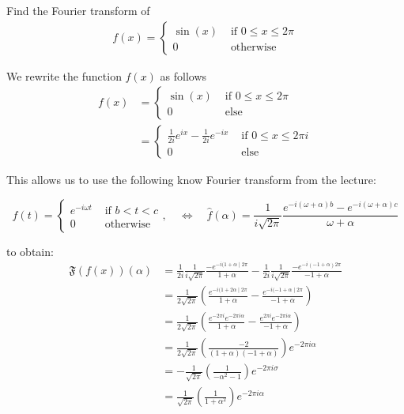 \documentclass[11pt]{article}
\begin{document}
\begin{exercise}
    Find the Fourier transform of 
    \begin{align*}
        f(x) = \left\{\begin{array}{ll}
                \sin(x) & \text{ if } 0 \leq x \leq 2 \pi 
                \\
                0 & \text{ otherwise }
               \end{array}
               \right.
    \end{align*}
\end{exercise}
\begin{solution} 
We rewrite the function $f(x)$ as follows    
$$\begin{aligned} f(x) & =\left\{\begin{array}{cl}\sin (x) & \text { if } 0 \leq x \leq 2 \pi \\ 0 & \text { else }\end{array}\right. \\ & =\left\{\begin{array}{cl}\frac{1}{2 i} e^{i x}-\frac{1}{2 i} e^{-i x} & \text { if } 0 \leq x \leq 2 \pi i \\ 0 & \text { else }\end{array}\right.\end{aligned}$$

This allows us to use the following know Fourier transform from the lecture:

$$
f(t)=\left\{\begin{array}{ll}
e^{-i \omega t} & \text { if } b<t<c \\
0 & \text { otherwise }
\end{array}, \quad \Longleftrightarrow \quad \hat{f}(\alpha)=\frac{1}{i \sqrt{2 \pi}} \frac{e^{-i(\omega+\alpha) b}-e^{-i(\omega+\alpha) c}}{\omega+\alpha}\right.
$$

to obtain:
$$\begin{aligned} \mathfrak{F}(f(x))(\alpha) & =\frac{1}{2 i} \frac{1}{i \sqrt{2 \pi}} \frac{-e^{-i(1+\alpha \mid 2 \pi}}{1+\alpha}-\frac{1}{2 i} \frac{1}{i \sqrt{2 \pi}} \frac{-e^{-i(-1+\alpha) 2 \pi}}{-1+\alpha} \\ & =\frac{1}{2 \sqrt{2 \pi}}\left(\frac{e^{-i(1+2 \alpha \mid 2 \pi}}{1+\alpha}-\frac{e^{-i(-1+\alpha \mid 2 \pi}}{-1+\alpha}\right) \\ & =\frac{1}{2 \sqrt{2 \pi}}\left(\frac{e^{-2 \pi i} e^{-2 \pi i \alpha}}{1+\alpha}-\frac{e^{2 \pi i} e^{-2 \pi i \alpha}}{-1+\alpha}\right) \\ & =\frac{1}{2 \sqrt{2 \pi}}\left(\frac{-2}{(1+\alpha)(-1+\alpha)}\right) e^{-2 \pi i \alpha} \\ & =-\frac{1}{\sqrt{2 \pi}}\left(\frac{1}{-\alpha^2-1}\right) e^{-2 \pi i \sigma} \\ & =\frac{1}{\sqrt{2 \pi}}\left(\frac{1}{1+\alpha^2}\right) e^{-2 \pi i \alpha}\end{aligned}$$
\end{solution}
\end{document}
